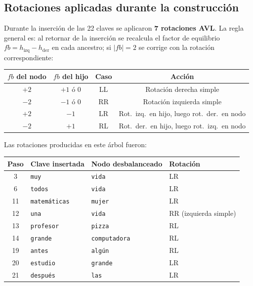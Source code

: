 \documentclass[12pt]{article}
\begin{document}
\subsection*{Rotaciones aplicadas durante la construcción}

Durante la inserción de las 22 claves se aplicaron \textbf{7 rotaciones AVL}.
La regla general es: al retornar de la inserción se recalcula el factor de
equilibrio $fb = h_{\text{izq}} - h_{\text{der}}$ en cada ancestro;
si $|fb| = 2$ se corrige con la rotación correspondiente:

\begin{center}
\begin{tabular}{cccc}
\toprule
\textbf{$fb$ del nodo} & \textbf{$fb$ del hijo} & \textbf{Caso} & \textbf{Acción} \\
\midrule
$+2$ & $+1$ ó $0$ & LL & Rotación derecha simple \\
$-2$ & $-1$ ó $0$ & RR & Rotación izquierda simple \\
$+2$ & $-1$       & LR & Rot.\ izq.\ en hijo, luego rot.\ der.\ en nodo \\
$-2$ & $+1$       & RL & Rot.\ der.\ en hijo, luego rot.\ izq.\ en nodo \\
\bottomrule
\end{tabular}
\end{center}

Las rotaciones producidas en este árbol fueron:

\begin{center}
\renewcommand{\arraystretch}{1.25}
\begin{tabular}{clll}
\toprule
\textbf{Paso} & \textbf{Clave insertada} & \textbf{Nodo desbalanceado} & \textbf{Rotación} \\
\midrule
 3  & \texttt{muy}          & \texttt{vida}          & LR \\
 6  & \texttt{todos}        & \texttt{vida}          & LR \\
11  & \texttt{matemáticas}  & \texttt{mujer}         & LR \\
12  & \texttt{una}          & \texttt{vida}          & RR (izquierda simple) \\
13  & \texttt{profesor}     & \texttt{pizza}         & RL \\
14  & \texttt{grande}       & \texttt{computadora}   & RL \\
19  & \texttt{antes}        & \texttt{algún}         & RL \\
20  & \texttt{estudio}      & \texttt{grande}        & LR \\
21  & \texttt{después}      & \texttt{las}           & LR \\
\bottomrule
\end{tabular}
\end{center}
\end{document}
